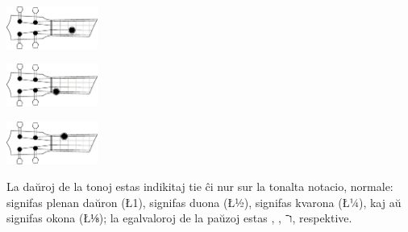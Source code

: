 \vspace{\baselineskip}
\begin{minipage}{4cm}
	\centering
	\includegraphics[width=3cm]{plano-C3.eps}\\
\end{minipage}\hfill
\begin{minipage}{4cm}
	\centering
	\includegraphics[width=3cm]{plano-G1.eps}\\
\end{minipage}\hfill
\begin{minipage}{4cm}
	\centering
	\includegraphics[width=3cm]{plano-A2.eps}\\
\end{minipage}
\vspace{\baselineskip}

La daŭroj de la tonoj estas indikitaj tie ĉi nur sur la tonalta notacio, normale:  signifas plenan daŭron (\L{1}),  signifas duona (\L{½}),  signifas kvarona (\L{¼}), kaj  aŭ  signifas okona (\L{⅛}); la egalvaloroj de la paŭzoj estas , ,  ו־, respektive.

